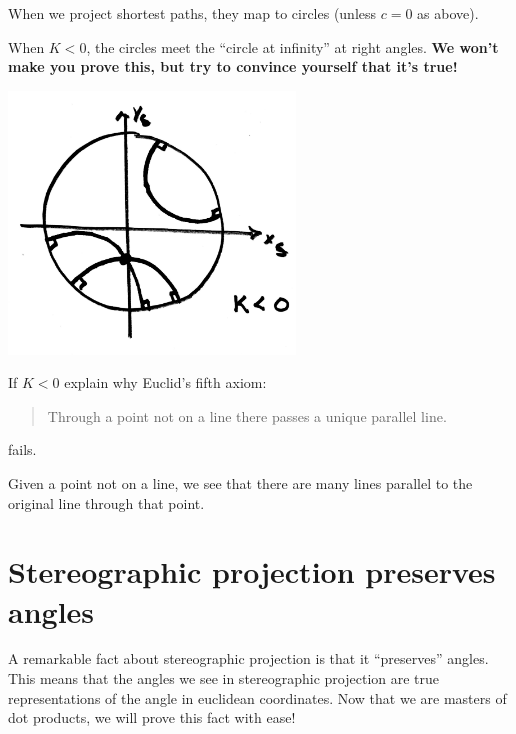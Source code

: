 \documentclass[newpage,hints,handout]{ximera}
\begin{document}
When we project shortest paths, they map to circles (unless $c=0$ as above).

When $K<0$, the circles meet the ``circle at infinity'' at right angles.
\textbf{We won't make you prove this, but try to convince yourself that it's true!}


\begin{image}
\includegraphics[width=3in]{stereoLines.png}
\end{image}

\begin{problem}
  If $K<0$ explain why Euclid's fifth axiom:
  \begin{quote}
    Through a point not on a line there passes a unique parallel line.
  \end{quote}
  fails.
  \begin{freeResponse}
    Given a point not on a line, we see that there are many lines
    parallel to the original line through that point.
  \end{freeResponse}
\end{problem}







\section{Stereographic projection preserves angles}


A remarkable fact about stereographic projection is that it
``preserves'' angles. This means that the angles we see in
stereographic projection are true representations of the angle in
euclidean coordinates.  Now that we are masters of dot products, we
will prove this fact with ease!
\end{document}
